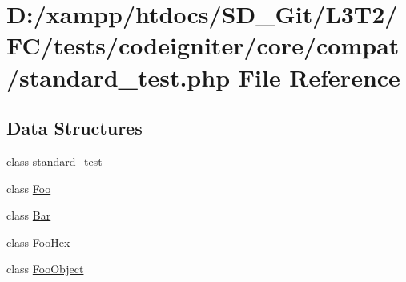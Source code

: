 \hypertarget{tests_2codeigniter_2core_2compat_2standard__test_8php}{}\section{D\+:/xampp/htdocs/\+S\+D\+\_\+\+Git/\+L3\+T2/\+F\+C/tests/codeigniter/core/compat/standard\+\_\+test.php File Reference}
\label{tests_2codeigniter_2core_2compat_2standard__test_8php}
\subsection*{Data Structures}
\begin{DoxyCompactItemize}
\item 
class \hyperlink{classstandard__test}{standard\+\_\+test}
\item 
class \hyperlink{class_foo}{Foo}
\item 
class \hyperlink{class_bar}{Bar}
\item 
class \hyperlink{class_foo_hex}{Foo\+Hex}
\item 
class \hyperlink{class_foo_object}{Foo\+Object}
\end{DoxyCompactItemize}
